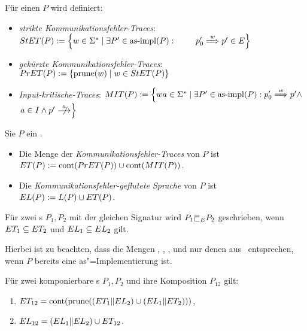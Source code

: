\begin{Def}
  Für einen \MEIO{} $P$ wird definiert:
  \begin{itemize}
    \item \emph{strikte Kommunikationsfehler-Traces}: $\StET (P) :=
      \left\{w\in\Sigma ^* \mid \exists P' \in\asimp (P) :
      \phantom{\weakmust[w]} \right.$ $\left. p'_0 \weakmust[w] p' \in
      E\right\}$ 
    \item \emph{gekürzte Kommunikationsfehler-Traces}: $PrET (P) :=
      \left\{\mathrm{prune} (w) \mid w\in StET (P)\right\}$
    \item \emph{Input-kritische-Traces}: $\MIT (P) := \left\{wa\in\Sigma ^* \mid
      \exists P' \in\asimp (P) : p'_0
      \weakmust[w] p' \land \right.$\linebreak $\left. a\in I\land p'\nmust[a]
      \right\}$ 
  \end{itemize}
\end{Def}

\begin{Def}
  \label{KommFehlerSemDef}
  Sie $P$ ein \MEIO{}.
  \begin{itemize}
    \item Die Menge der \emph{Kommunikationsfehler-Traces} von $P$ ist $ET (P)
      := \mathrm{cont} (PrET (P)) \cup\mathrm{cont} (MIT (P))$.
    \item Die \emph{Kommunikationsfehler-geflutete Sprache} von $P$ ist $EL
      (P) := L(P) \cup ET (P)$.
  \end{itemize}
  Für zwei \MEIO{}s $P_1,P_2$ mit der gleichen Signatur wird $P_1\ERel P_2$
  geschrieben, wenn $ET _1\subseteq ET _2$ und $EL _1 \subseteq EL _2$
  gilt.
\end{Def}

Hierbei ist zu beachten, dass die Mengen \StET{}, \PrET{}, \MIT{}, \ET{} und
\EL{} nur denen aus~\cite{Schinko2016BA} entsprechen, wenn $P$ bereits eine
as"=Implementierung ist.

\begin{Satz}
  Für zwei komponierbare \MEIO{}s $P_1,P_2$ und ihre Komposition $P_{12}$ gilt:
  \begin{enumerate}
    \item $ET _{12} = \mathrm{cont} (\mathrm{prune} ((ET _1\|EL _2) \cup (EL _1\|ET
      _2)))$,
    \item $EL _{12} = (EL _1\|EL _2) \cup ET _{12}$.
  \end{enumerate}
\end{Satz}

